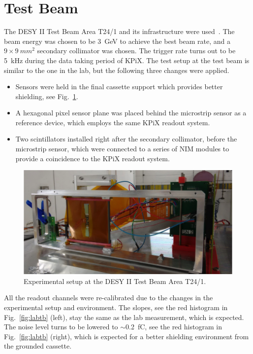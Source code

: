 \documentclass[journal]{IEEEtran}
\begin{document}
\section{Test Beam}
The DESY II Test Beam Area T24/1 and its infrastructure were used~\cite{desytbf}.
The beam energy was chosen to be \SI{3}{GeV} to achieve the best beam rate, and a $9\times\SI{9}{mm^2}$ secondary collimator was chosen.
The trigger rate turns out to be \SI{5}{kHz} during the data taking period of KPiX.
The test setup at the test beam is similar to the one in the lab, but the following three changes were applied.
\begin{itemize}
  \item Sensors were held in the final cassette support which provides better shielding, see Fig.~\ref{fig:tb2}.
  \item A hexagonal pixel sensor plane was placed behind the microstrip sensor as a reference device, which employs the same KPiX readout system.
  \item Two scintillators installed right after the secondary collimator, before the microstrip sensor, which were connected to a series of NIM modules to provide a coincidence to the KPiX readout system.
\end{itemize}

\begin{figure}[!ht]%
  \centering
  \includegraphics[width=0.9\linewidth]{pics/tb_2.png}
  \caption{Experimental setup at the DESY II Test Beam Area T24/1.}%
\label{fig:tb2}%
\end{figure}

All the readout channels were re-calibrated due to the changes in the experimental setup and environment.
The slopes, see the red histogram in Fig.~\ref{fig:labtb} (left), stay the same as the lab measurement, which is expected.
The noise level turns to be lowered to $\sim$\SI{0.2}{fC}, see the red histogram in Fig.~\ref{fig:labtb} (right),
which is expected for a better shielding environment from the grounded cassette.
\end{document}
